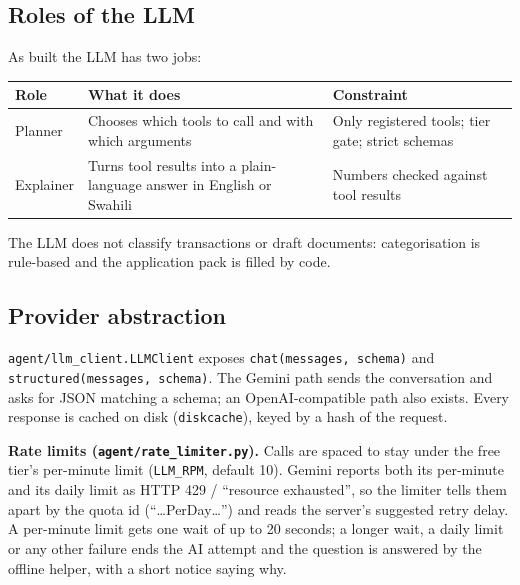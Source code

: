 \documentclass[10pt,a4paper]{article}
\newcommand{\code}[1]{\texttt{\small #1}}
\begin{document}
\subsection{Roles of the LLM}
As built the LLM has two jobs:
\begin{center}
\begin{tabularx}{\textwidth}{@{}p{3.4cm}p{5.2cm}Y@{}}
\toprule
\textbf{Role} & \textbf{What it does} & \textbf{Constraint}\\
\midrule
Planner & Chooses which tools to call and with which arguments & Only registered tools; tier gate; strict schemas\\
Explainer & Turns tool results into a plain-language answer in English or Swahili & Numbers checked against tool results\\
\bottomrule
\end{tabularx}
\end{center}
The LLM does not classify transactions or draft documents: categorisation is rule-based and the application pack is filled by code.

\subsection{Provider abstraction}
\code{agent/llm\_client.LLMClient} exposes \code{chat(messages, schema)} and \code{structured(messages, schema)}. The Gemini path sends the conversation and asks for JSON matching a schema; an OpenAI-compatible path also exists. Every response is cached on disk (\code{diskcache}), keyed by a hash of the request.

\textbf{Rate limits (\code{agent/rate\_limiter.py}).} Calls are spaced to stay under the free tier's per-minute limit (\code{LLM\_RPM}, default 10). Gemini reports both its per-minute and its daily limit as HTTP 429 / ``resource exhausted'', so the limiter tells them apart by the quota id (``\ldots PerDay\ldots'') and reads the server's suggested retry delay. A per-minute limit gets one wait of up to 20 seconds; a longer wait, a daily limit or any other failure ends the AI attempt and the question is answered by the offline helper, with a short notice saying why.
\end{document}
